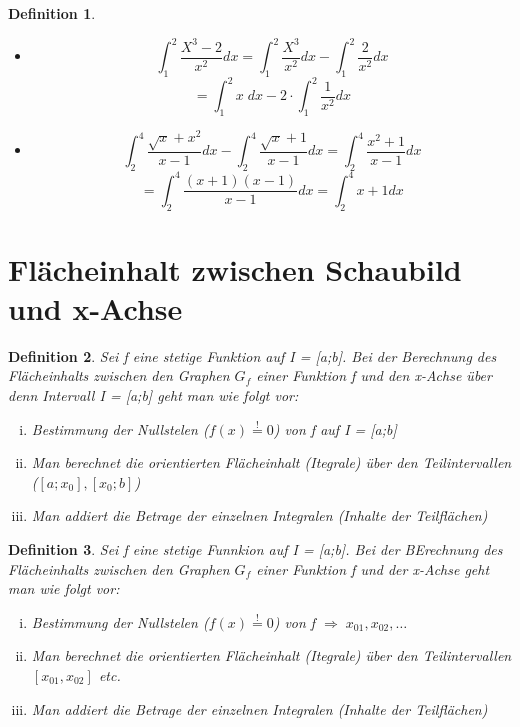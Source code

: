 \documentclass{article}
\newtheorem{definition}{Definition}
\begin{document}
\begin{definition}
\begin{itemize}

\item 
\[\int_1^2 \frac {X^3-2}{x^2}dx = \int_1^2 \frac {X^3}{x^2}dx - \int_1^2 \frac 2{x^2}dx\]
\[ = \int_1^2 x \;dx - 2 \cdot \int_1^2 \frac 1 {x^2}dx\]

\item
 \[\int_2^4 \frac{\sqrt{x}+x^2}{x-1} dx - \int_2^4 \frac{\sqrt{x}+1}{x-1}dx = \int_2^4 \frac{x^2+1}{x-1}dx\]
\[= \int_2^4 \frac{(x+1)(x-1)}{x-1}dx = \int_2^4 x+1 dx\]
\end{itemize}



\end{definition}
\section{Flächeinhalt zwischen Schaubild und x-Achse}

\begin{definition}
Sei f eine stetige Funktion auf I = [a;b]. Bei der Berechnung des Flächeinhalts zwischen den Graphen $G_f$ einer Funktion f und den x-Achse über  denn Intervall I = [a;b] geht man wie folgt vor:

\begin{enumerate}[i)]

\item Bestimmung der Nullstelen ($f(x) \overset{!}{=}0$) von f auf I = [a;b]
\item Man berechnet die orientierten Flächeinhalt (Itegrale) über den Teilintervallen ($[a;x_0],[x_0;b]$)
\item Man addiert die Betrage der einzelnen Integralen (Inhalte der Teilflächen)

\end{enumerate}

\end{definition}

\begin{definition}
Sei f eine stetige Funnkion auf I = [a;b]. Bei der BErechnung des Flächeinhalts zwischen den Graphen $G_f$ einer Funktion f und der x-Achse geht man wie folgt vor:

\begin{enumerate}[i)]

\item Bestimmung der Nullstelen ($f(x) \overset{!}{=}0$) von f $\Rightarrow \; x_{01}, x_{02}, \dots$

\item Man berechnet die orientierten Flächeinhalt (Itegrale) über den Teilintervallen $[x_{01}, x_{02}]$ etc.

\item Man addiert die Betrage der einzelnen Integralen (Inhalte der Teilflächen)
\end{enumerate}


\end{definition}
\end{document}
